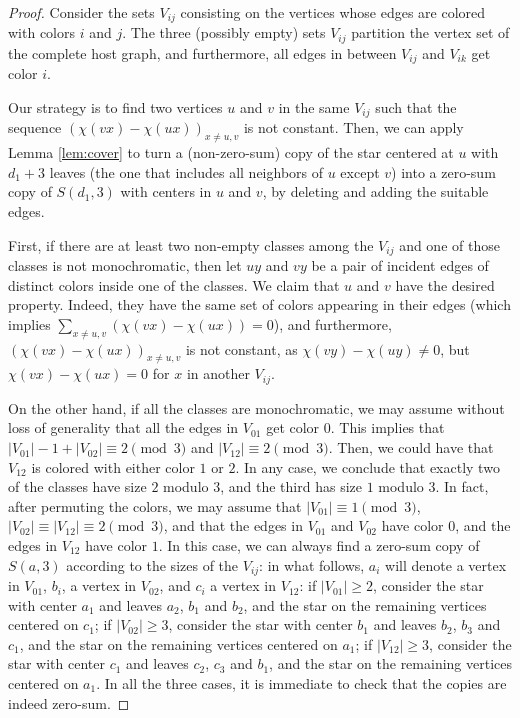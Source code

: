 \documentclass[11pt]{article}
\begin{document}
\begin{proof}
    Consider the sets $V_{ij}$ consisting on the vertices whose edges are colored with colors $i$ and $j$. The three (possibly empty) sets $V_{ij}$ partition the vertex set of the complete host graph, and furthermore, all edges in between $V_{ij}$ and $V_{ik}$ get color $i$.


    Our strategy is to find two vertices $u$ and $v$ in the same $V_{ij}$ such that the sequence $(\chi(vx)-\chi(ux))_{x \neq u, v}$ is not constant. Then, we can apply Lemma \ref{lem:cover} to turn a (non-zero-sum) copy of the star centered at $u$ with $d_1+3$ leaves (the one that includes all neighbors of $u$ except $v$) into a zero-sum copy of $S(d_1,3)$ with centers in $u$ and $v$, by deleting and adding the suitable edges.


    First, if there are at least two non-empty classes among the $V_{ij}$ and one of those classes is not monochromatic, then let $uy$ and $vy$ be a pair of incident edges of distinct colors inside one of the classes. We claim that $u$ and $v$ have the desired property. Indeed, they have the same set of colors appearing in their edges (which implies $\sum_{x \neq u, v} (\chi(vx)-\chi(ux))=0$), and furthermore, $(\chi(vx)-\chi(ux))_{x \neq u, v}$ is not constant, as $\chi(vy)-\chi(uy) \neq 0$, but $\chi(vx)-\chi(ux)=0$ for $x$ in another $V_{ij}$.

    On the other hand, if all the classes are monochromatic, we may assume without loss of generality that all the edges in $V_{01}$ get color $0$. This implies that $|V_{01}|-1+|V_{02}| \equiv 2 \pmod 3$ and $|V_{12}| \equiv 2 \pmod 3$. Then, we could have that $V_{12}$ is colored with either color $1$ or $2$. In any case, we conclude that exactly two of the classes have size $2$ modulo $3$, and the third has size $1$ modulo $3$. In fact, after permuting the colors, we may assume that $|V_{01}| \equiv 1 \pmod{3}$, $|V_{02}| \equiv |V_{12}| \equiv 2 \pmod 3$, and that the edges in $V_{01}$ and $V_{02}$ have color $0$, and the edges in $V_{12}$ have color $1$. In this case, we can always find a zero-sum copy of $S(a,3)$ according to the sizes of the $V_{ij}$: in what follows, $a_i$ will denote a vertex in $V_{01}$, $b_i$, a vertex in $V_{02}$, and $c_i$ a vertex in $V_{12}$: if $|V_{01}| \geq 2$, consider the star with center $a_1$ and leaves $a_2$, $b_1$ and $b_2$, and the star on the remaining vertices centered on $c_1$; if $|V_{02}| \geq 3$, consider the star with center $b_1$ and leaves $b_2$, $b_3$ and $c_1$, and the star on the remaining vertices centered on $a_1$; if $|V_{12}| \geq 3$, consider the star with center $c_1$ and leaves $c_2$, $c_3$ and $b_1$, and the star on the remaining vertices centered on $a_1$. In all the three cases, it is immediate to check that the copies are indeed zero-sum.


\end{proof}
\end{document}
